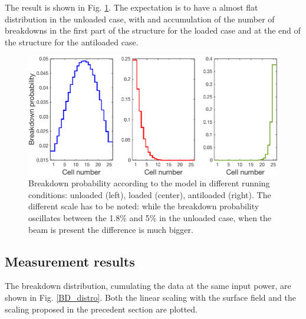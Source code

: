 The result is shown in Fig. \ref{BD_prob}. The expectation is to have a almost flat distribution in the unloaded case, with and accumulation of the number of breakdowns in the first part of the structure for the loaded case and at the end of the structure for the antiloaded case.


\begin{figure}[h]
\centering 
\includegraphics[scale=0.45]{pictures/BD_probability.png}
\caption{Breakdown probability according to the model in different running conditions: unloaded (left), loaded (center), antiloaded (right). The different scale has to be noted: while the breakdown probability oscillates between the 1.8\% and 5\% in the unloaded case, when the beam is present the difference is much bigger.}
\label{BD_prob}
\end{figure}


\subsection[Measurement results]{Measurement results}

The breakdown distribution, cumulating the data at the same input power, are shown in Fig. \ref{BD_distro}. Both the linear scaling with the surface field and the scaling proposed in the precedent section are plotted.


